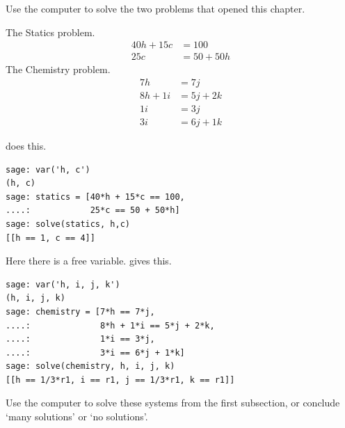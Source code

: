 \begin{exercises}
  \item 
    Use the computer to solve the two problems that opened this
    chapter.
    \begin{exparts}
      \partsitem The Statics problem.
         \begin{align*}
            40h+15c  &= 100  \\
            25c      &= 50+50h
         \end{align*}
      \partsitem The Chemistry problem.
         \begin{align*} 
             7h      &= 7j  \\
             8h +1i  &= 5j+2k  \\
             1i      &= 3j  \\
             3i      &= 6j+1k
         \end{align*}
    \end{exparts}
    \begin{answer}
      \begin{exparts}
        \partsitem 
\Sage{} does this.
\begin{lstlisting}
sage: var('h, c')
(h, c)
sage: statics = [40*h + 15*c == 100,
....:            25*c == 50 + 50*h]
sage: solve(statics, h,c)
[[h == 1, c == 4]] 
\end{lstlisting}
        \partsitem Here there is a free variable.
\Sage{} gives this.
\begin{lstlisting}
sage: var('h, i, j, k')
(h, i, j, k)
sage: chemistry = [7*h == 7*j,
....:              8*h + 1*i == 5*j + 2*k,
....:              1*i == 3*j,
....:              3*i == 6*j + 1*k]
sage: solve(chemistry, h, i, j, k)
[[h == 1/3*r1, i == r1, j == 1/3*r1, k == r1]]          
\end{lstlisting}
      \end{exparts}
    \end{answer}
\item 
    Use the computer to solve these systems from the
    first subsection,
    or conclude `many solutions' or `no solutions'.
\end{exercises}
